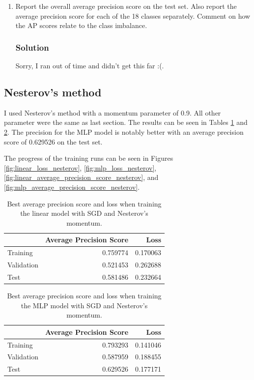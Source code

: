 \documentclass[letterpaper,11pt]{article}
\begin{document}
\begin{enumerate}
\item Report the overall average precision score on the test set. Also report
  the average precision score for each of the 18 classes separately. Comment on
  how the AP scores relate to the class imbalance.

  \subsubsection*{Solution}

  Sorry, I ran out of time and didn't get this far :(.
  
\end{enumerate}

\subsection*{Nesterov's method}

I used Nesterov's method with a momentum parameter of 0.9. All other parameter
were the same as last section. The results can be seen in Tables
\ref{tab:linear_nesterov} and \ref{tab:mlp_nesterov}. The precision for the MLP
model is notably better with an average precision score of 0.629526 on the test
set.

The progress of the training runs can be seen in Figures
\ref{fig:linear_loss_nesterov}, \ref{fig:mlp_loss_nesterov},
\ref{fig:linear_average_precision_score_nesterov}, and
\ref{fig:mlp_average_precision_score_nesterov}.

  \begin{table}
    \centering
    \begin{tabular}{lrr}
      \toprule
      {} &  Average Precision Score &      Loss \\
      \midrule
      Training   &                 0.759774 &  0.170063 \\
      Validation &                 0.521453 &  0.262688 \\
      Test       &                 0.581486 &  0.232664 \\
      \bottomrule
    \end{tabular}
    \caption{Best average precision score and loss when training the linear
      model with SGD and Nesterov's momentum.}
    \label{tab:linear_nesterov}
  \end{table}

    \begin{table}
      \centering
      \begin{tabular}{lrr}
        \toprule
        {} &  Average Precision Score &      Loss \\
        \midrule
        Training   &                 0.793293 &  0.141046 \\
        Validation &                 0.587959 &  0.188455 \\
        Test       &                 0.629526 &  0.177171 \\
        \bottomrule
      \end{tabular}
      \caption{Best average precision score and loss when training the MLP
        model with SGD and Nesterov's momentum.}
    \label{tab:mlp_nesterov}
  \end{table}
\end{document}
